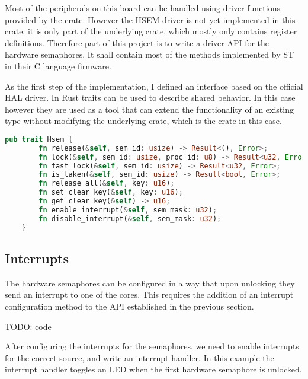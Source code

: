 Most of the peripherals on this board can be handled using driver functions provided by the  crate. However the HSEM driver is not yet implemented in this crate, it is only part of the underlying  crate, which mostly only contains register definitions. Therefore part of this project is to write a driver API for the hardware semaphores. It shall contain most of the methods implemented by ST in their C language firmware.\cite{HsemCCode}

As the first step of the implementation, I defined an interface based on the official HAL driver. In Rust traits can be used to describe shared behavior. In this case however they are used as a tool that can extend the functionality of an existing type without modifying the underlying crate, which is the  crate in this case.

\begin{lstlisting}[language=Rust,frame=single,float=!ht,style=customrust,label={lst:todolabel},caption={todocaption},style=customrust]
    pub trait Hsem {
        fn release(&self, sem_id: usize) -> Result<(), Error>;
        fn lock(&self, sem_id: usize, proc_id: u8) -> Result<u32, Error>;
        fn fast_lock(&self, sem_id: usize) -> Result<u32, Error>;
        fn is_taken(&self, sem_id: usize) -> Result<bool, Error>;
        fn release_all(&self, key: u16);
        fn set_clear_key(&self, key: u16);
        fn get_clear_key(&self) -> u16;
        fn enable_interrupt(&self, sem_mask: u32);
        fn disable_interrupt(&self, sem_mask: u32);
    }
\end{lstlisting}

\subsection{Interrupts}

The hardware semaphores can be configured in a way that upon unlocking they send an interrupt to one of the cores. This requires the addition of an interrupt configuration method to the API established in the previous section.

TODO: code

After configuring the interrupts for the semaphores, we need to enable interrupts for the correct source, and write an interrupt handler. In this example the interrupt handler toggles an LED when the first hardware semaphore is unlocked.
